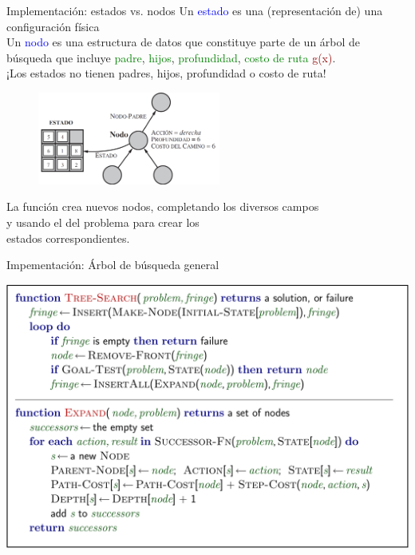 \documentclass{beamer}
\theoremstyle{definition}
\theoremstyle{theorem}
\theoremstyle{remark}
\begin{document}
\begin{frame}{Implementación: estados vs. nodos}
    Un \textcolor{blue}{estado} es una (representación de) una configuración física\\
    Un \textcolor{blue}{nodo} es una estructura de datos que constituye parte de un árbol de búsqueda que incluye \textcolor{Green}{padre}, \textcolor{Green}{hijos}, \textcolor{Green}{profundidad}, \textcolor{Green}{costo de ruta} \textcolor{DarkRed}{g(x)}.\\
    ¡Los estados no tienen padres, hijos, profundidad o costo de ruta!
    \begin{figure}
        \centering
        \includegraphics[width = 60mm, scale = 0.7]{29_image.PNG}
    \end{figure}
    La función  crea nuevos nodos, completando los diversos campos\\
    \hspace{0.8cm}y usando el  del problema para crear los\\
    \hspace{0.8cm}estados correspondientes.
\end{frame}

\begin{frame}{Impementación: Árbol de búsqueda general}
    \begin{right}
        
        \includegraphics[scale = 0.5]{30_general_tree_search.png}
        
    \end{right}
\end{frame}
\end{document}
